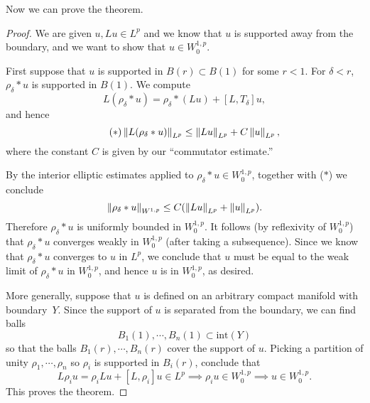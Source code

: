 \documentclass{amsart}
\begin{document}
   Now we can prove the theorem.
   \begin{proof}
     We are given $u,Lu\in L^{p}$ and we know that $u$ is supported
     away from the boundary, and we want to show that $u\in
     W^{1,p}_{0}$.

     First suppose that $u$ is supported in $B(r)\subset B(1)$ for
     some $r<1$. For $\delta<r$, $\rho_{\delta}\ast u$ is supported in
     $B(1)$. We compute
     \begin{equation*}
       L(\rho_{\delta}\ast u)=\rho_{\delta}\ast (L u)+[L,T_{\delta}]u,
     \end{equation*}
     and hence
     \begin{equation*}\tag{$\ast$}
       \left\lVert L(\rho_{\delta}\ast u)\right\rVert_{L^{p}}\le \left\lVert Lu\right\rVert_{L^{p}}+C\left\lVert u\right\rVert_{L^{p}},
     \end{equation*}
     where the constant $C$ is given by our ``commutator estimate.''

     By the interior elliptic estimates applied to $\rho_{\delta}\ast
     u\in W^{1,p}_{0}$, together with ($\ast$) we conclude
     \begin{equation*}
       \left\lVert\rho_{\delta}\ast u\right\rVert_{W^{1,p}}\le C(\left\lVert Lu\right\rVert_{L^{p}}+\left\lVert u\right\rVert_{L^{p}}).
     \end{equation*}
     Therefore $\rho_{\delta}\ast u$ is uniformly bounded in
     $W^{1,p}_{0}$. It follows (by reflexivity of $W^{1,p}_{0}$) that
     $\rho_{\delta}\ast u$ converges weakly in $W^{1,p}_{0}$ (after
     taking a subsequence). Since we know that $\rho_{\delta}\ast u$
     converges to $u$ in $L^{p}$, we conclude that $u$ must be equal
     to the weak limit of $\rho_{\delta}\ast u$ in $W^{1,p}_{0}$, and
     hence $u$ is in $W^{1,p}_{0}$, as desired.

     More generally, suppose that $u$ is defined on an arbitrary
     compact manifold with boundary~$Y$. Since the support of $u$ is
     separated from the boundary, we can find balls
     $$B_{1}(1),\cdots,B_{n}(1)\subset \text{int}(Y)$$ so that the balls
     $B_{1}(r),\cdots,B_{n}(r)$ cover the support of $u$. Picking a
     partition of unity $\rho_{1},\cdots,\rho_{n}$ so $\rho_{i}$ is
     supported in $B_{i}(r)$, conclude that
     \begin{equation*}
       L\rho_{i}u=\rho_{i}Lu+[L,\rho_{i}]u\in L^{p}\implies
       \rho_{i}u\in W^{1,p}_{0}\implies u\in W^{1,p}_{0}.
     \end{equation*}     
     This proves the theorem.     
   \end{proof}
\end{document}
